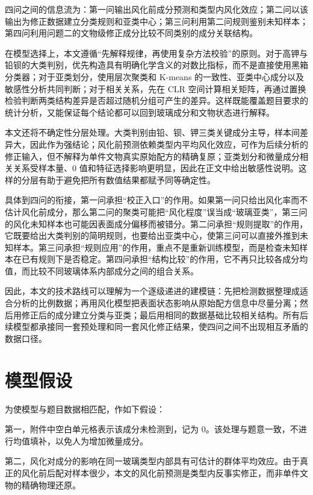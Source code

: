 \documentclass[UTF8,zihao=-4,a4paper,fontset=fandol]{ctexart}
\begin{document}
四问之间的信息流为：第一问输出风化前成分预测和类型内风化效应；第二问以该输出为修正数据建立分类规则和亚类中心；第三问利用第二问规则鉴别未知样本；第四问利用问题二的文物级修正成分比较不同类别的成分关联结构。

在模型选择上，本文遵循“先解释规律，再使用复杂方法校验”的原则。对于高钾与铅钡的大类判别，优先构造具有明确化学含义的对数比指标，而不是直接使用黑箱分类器；对于亚类划分，使用层次聚类和 K-means 的一致性、亚类中心成分以及敏感性分析共同判断；对于相关关系，先在 CLR 空间计算相关矩阵，再通过置换检验判断两类结构差异是否超过随机分组可产生的差异。这样既能覆盖题目要求的统计分析，又能保证每个结论都可以回到玻璃成分和文物状态进行解释。

本文还将不确定性分层处理。大类判别由铅、钡、钾三类关键成分主导，样本间差异大，因此作为强结论；风化前预测依赖类型内平均风化效应，可作为后续分析的修正输入，但不解释为单件文物真实原始配方的精确复原；亚类划分和微量成分相关关系受样本量、0 值和特征选择影响更明显，因此在正文中给出敏感性说明。这样的分层有助于避免把所有数值结果都赋予同等确定性。

具体到四问的衔接，第一问承担“校正入口”的作用。如果第一问只给出风化率而不估计风化前成分，那么第二问的聚类可能把“风化程度”误当成“玻璃亚类”，第三问的风化未知样本也可能因表面成分偏移而被错分。第二问承担“规则提取”的作用，它既要给出大类判别的简明规则，也要给出亚类中心，使第三问可以直接外推到未知样本。第三问承担“规则应用”的作用，重点不是重新训练模型，而是检查未知样本在已有规则下是否稳定。第四问承担“结构比较”的作用，它不再只比较各成分均值，而比较不同玻璃体系内部成分之间的组合关系。

因此，本文的技术路线可以理解为一个逐级递进的建模链：先把检测数据整理成适合分析的比例数据；再用风化模型把表面状态影响从原始配方信息中尽量分离；然后用修正后的成分建立分类与亚类；最后用相同的数据基础比较相关结构。所有后续模型都承接同一套预处理和同一套风化修正结果，使四问之间不出现相互矛盾的数据口径。

\section{模型假设}

为使模型与题目数据相匹配，作如下假设：

第一，附件中空白单元格表示该成分未检测到，记为 0。该处理与题意一致，不进行均值填补，以免人为增加微量成分。

第二，风化对成分的影响在同一玻璃类型内部具有可估计的群体平均效应。由于真正的风化前后配对样本很少，本文的风化前预测是类型内反事实修正，而非单件文物的精确物理还原。
\end{document}
